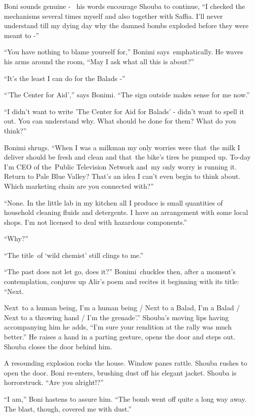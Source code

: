 \documentclass[twoside,11pt]{book}
\begin{document}
Boni sounds genuine - \ his words encourage Shouba to continue, ``I checked the mechanisms several times
myself and also together with Saffia. I'll never understand till my dying day{
}why the damned{ }bombs exploded before they were meant to -''

``You have nothing to blame yourself for,'' Bonimi says~emphatically. He waves his arms around
the room, ``May I ask what all this is about?''

``It's the least I can do for the Balads -''

``'The Center for Aid','' says Bonimi. ``The sign outside makes sense for me
now.''

``I didn't want to write 'The Center for Aid for Balads' - didn't want to spell it out. You can understand
why. What should be done for them? What do you think?''

Bonimi shrugs. ``When I was a milkman my only worries were that~the milk I deliver should be fresh and
clean and that~the bike's tires be pumped up. To-day I'm CEO of the~Public Television Network and~my only worry is
running it.~ Return to Pale Blue Valley? That's an idea I can't even begin to think about. Which marketing chain are
you connected with?''

``None. In the little lab in my kitchen all I produce is small quantities of household cleaning fluids and
detergents. I have an arrangement with some local shops. I'm not licensed to deal with hazardous
components.''

``Why?''

``The title~of `wild chemist' still clings to me.''

``The past does not let go, does it?'' Bonimi~chuckles then, after a moment's contemplation,
conjures up Alir's poem and recites it beginning with its title: ``Next.

Next~to a human being, I'm a human being / Next to a Balad, I'm a Balad / Next to a throwing hand / I'm the
grenade'.'' Shouba's moving lips having accompanying him he adds, ``I'm sure your rendition
at the rally was much better.'' He raises a hand in a parting gesture, opens the door and steps out.
Shouba closes the door behind him.

A resounding explosion rocks the house. Window panes rattle. Shouba rushes to open the door. Boni re-enters, brushing
dust off his elegant jacket. Shouba is horrorstruck. ``Are you alright!?''

``I am,'' Boni hastens to assure him. ``The bomb went off quite a long way away. The blast, though, covered
me with dust.''
\end{document}
